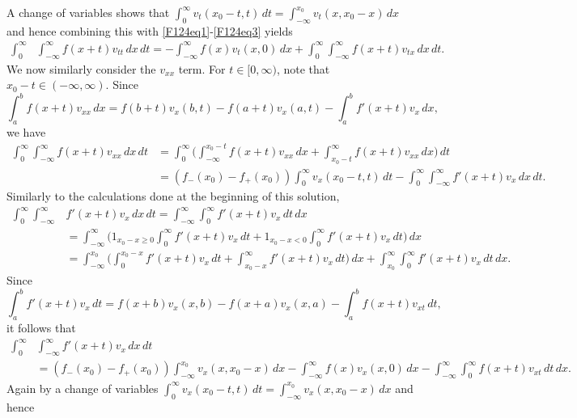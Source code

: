 A change of variables shows that
$\int_{0}^{\infty}v_{t}(x_{0} - t, t)\, dt = \int_{-\infty}^{x_{0}}v_{t}(x, x_{0} - x)\, dx$
and hence combining this with \eqref{F124eq1}-\eqref{F124eq3} yields
\begin{align}\label{F124eq5}
\int_{0}^{\infty}&\int_{-\infty}^{\infty}f(x + t)v_{tt}\, dx\, dt = -\int_{-\infty}^{\infty}f(x)v_{t}(x, 0)\, dx + \int_{0}^{\infty}\int_{-\infty}^{\infty}f(x + t)v_{tx}\, dx\, dt.
\end{align}
We now similarly consider the $v_{xx}$ term. For $t \in [0, \infty)$, note that $x_{0} - t \in (-\infty, \infty)$.
Since
$$\int_{a}^{b}f(x + t)v_{xx}\, dx = f(b + t)v_{x}(b, t) - f(a + t)v_{x}(a, t) - \int_{a}^{b}f'(x + t)v_{x}\, dx,$$
we have
\begin{align*}
\int_{0}^{\infty}\int_{-\infty}^{\infty}f(x + t)v_{xx}\, dx\, dt &= \int_{0}^{\infty}\bigg(\int_{-\infty}^{x_{0} - t}f(x + t)v_{xx}\, dx + \int_{x_{0} - t}^{\infty}f(x + t)v_{xx}\, dx\bigg)\, dt\\
&= (f_{-}(x_{0}) - f_{+}(x_{0}))\int_{0}^{\infty}v_{x}(x_{0} - t, t)\, dt - \int_{0}^{\infty}\int_{-\infty}^{\infty}f'(x + t)v_{x}\, dx\, dt.
\end{align*}
Similarly to the calculations done at the beginning of this solution,
\begin{align*}
\int_{0}^{\infty}\int_{-\infty}^{\infty}&f'(x + t)v_{x}\, dx\, dt = \int_{-\infty}^{\infty}\int_{0}^{\infty}f'(x + t)v_{x}\, dt\, dx\\
&= \int_{-\infty}^{\infty}\bigg(1_{x_{0} - x \geq 0}\int_{0}^{\infty}f'(x + t)v_{x}\, dt + 1_{x_{0} - x < 0}\int_{0}^{\infty}f'(x + t)v_{x}\, dt\bigg)\, dx\\
&= \int_{-\infty}^{x_{0}}\bigg(\int_{0}^{x_{0} - x}f'(x + t)v_{x}\, dt + \int_{x_{0} - x}^{\infty}f'(x + t)v_{x}\, dt\bigg)\, dx + \int_{x_{0}}^{\infty}\int_{0}^{\infty}f'(x + t)v_{x}\, dt\, dx.
\end{align*}
Since
$$\int_{a}^{b}f'(x + t)v_{x}\, dt = f(x + b)v_{x}(x, b) - f(x + a)v_{x}(x, a) - \int_{a}^{b}f(x + t)v_{xt}\, dt,$$
it follows that
\begin{align*}
\int_{0}^{\infty}&\int_{-\infty}^{\infty}f'(x + t)v_{x}\, dx\, dt\\
& = (f_{-}(x_{0}) - f_{+}(x_{0}))\int_{-\infty}^{x_{0}}v_{x}(x, x_{0} - x)\, dx - \int_{-\infty}^{\infty}f(x)v_{x}(x,0)\, dx - \int_{-\infty}^{\infty}\int_{0}^{\infty}f(x + t)v_{xt}\, dt\, dx.
\end{align*}
Again by a change of variables $\int_{0}^{\infty}v_{x}(x_{0} - t, t)\, dt =\int_{-\infty}^{x_{0}}v_{x}(x, x_{0} - x)\, dx$ and hence

